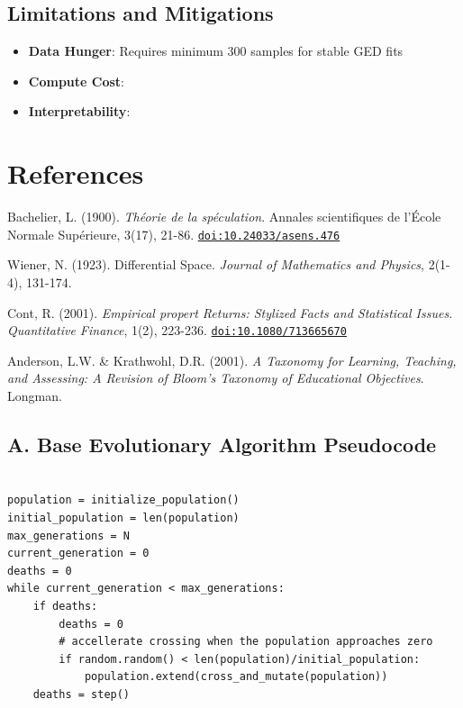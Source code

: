 \documentclass[12pt]{article}
\begin{document}
\subsection{Limitations and Mitigations}
\begin{itemize}
\item \textbf{Data Hunger}: Requires minimum 300 samples for stable GED fits
\item \textbf{Compute Cost}:
\item \textbf{Interpretability}:
\end{itemize}

\section*{References}
\label{sec:references}

\begin{thebibliography}{9}

Bachelier, L. (1900). \textit{Théorie de la spéculation}. Annales scientifiques de l'École Normale Supérieure, 3(17), 21-86.
\href{https://doi.org/10.24033/asens.476}{\texttt{doi:10.24033/asens.476}}

Wiener, N. (1923). Differential Space. \textit{Journal of Mathematics and Physics}, 2(1-4), 131-174.

Cont, R. (2001). \textit{Empirical propert Returns: Stylized Facts and Statistical Issues. Quantitative Finance}, 1(2), 223-236.
\href{https://doi.org/10.1080/713665670}{\texttt{doi:10.1080/713665670}}

Anderson, L.W. \& Krathwohl, D.R. (2001). \textit{A Taxonomy for Learning, Teaching, and Assessing: A Revision of Bloom's Taxonomy of Educational Objectives}. Longman.

\end{thebibliography}

\subsection*{A. Base Evolutionary Algorithm Pseudocode}
\begin{lstlisting}

population = initialize_population()
initial_population = len(population)
max_generations = N
current_generation = 0
deaths = 0
while current_generation < max_generations:
    if deaths:
        deaths = 0
        # accellerate crossing when the population approaches zero
        if random.random() < len(population)/initial_population:
            population.extend(cross_and_mutate(population))
    deaths = step()

\end{lstlisting}
\end{document}
